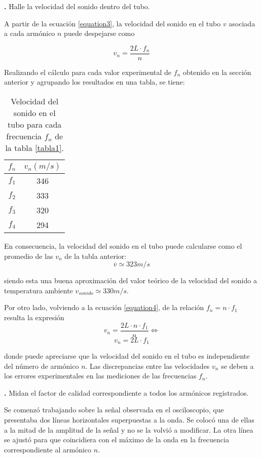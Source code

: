 \documentclass[12pt, a4paper]{article}
\newcounter{step}
\newcommand{\step}[1]
{
  \par\vspace{2ex}
  \stepcounter{step}
  \noindent\textbf{\arabic{step}.} #1\par\vspace{1ex}
}
\begin{document}
\step{Halle la velocidad del sonido dentro del tubo.}

A partir de la ecuación \ref{equation3}, la velocidad del sonido en el tubo $v$ asociada a cada armónico $n$ puede despejarse como

\begin{equation}
  v_{n} = \frac{2L \cdot f_{n}}{n}
  \label{equation4}
\end{equation}

Realizando el cálculo para cada valor experimental de $f_{n}$ obtenido en la sección anterior y agrupando los resultados en una tabla, se tiene:

\begin{table}[H]
    \centering
    \begin{tabular}{|c|c|}
    \hline
    \multirow{1}{2.1cm}{\centering $f_n$} 
        & $v_{n} (m/s)$ \\
    \hline
    $f_1$  & 346 \\ \hline
    $f_2$  & 333 \\ \hline
    $f_3$  & 320 \\ \hline
    $f_4$  & 294  \\ \hline
    \end{tabular}
    \caption{Velocidad del sonido en el tubo para cada frecuencia $f_{n}$ de la tabla \ref{tabla1}.}
    \label{tabla2}
\end{table}

En consecuencia, la velocidad del sonido en el tubo puede calcularse como el promedio de las $v_{n}$ de la tabla anterior:
$$\overline{v} \simeq 323 m/s$$

siendo esta una buena aproximación del valor teórico de la velocidad del sonido a temperatura ambiente $v_{sonido}\simeq 330 m/s$.

Por otro lado, volviendo a la ecuación \ref{equation4}, de la relación $f_{n}=n\cdot f_{1}$ resulta la expresión
$$ v_{n} = \frac{2L \cdot n \cdot f_{1}}{n} \Longleftrightarrow $$
$$ v_{n} = 2L \cdot f_{1} $$

donde puede apreciarse que la velocidad del sonido en el tubo es independiente del número de armónico $n$. Las discrepancias entre las velocidades $v_{n}$ se deben a los errores experimentales en las mediciones de las frecuencias $f_{n}$.


\step{Midan el factor de calidad correspondiente a todos los armónicos registrados.}

Se comenzó trabajando sobre la señal observada en el osciloscopio, que presentaba dos líneas horizontales superpuestas a la onda. Se colocó una de ellas a la mitad de la amplitud de la señal y no se la  volvió a modificar. La otra línea se ajustó para que coincidiera con el máximo de la onda en la frecuencia correspondiente al armónico $n$.
\end{document}
